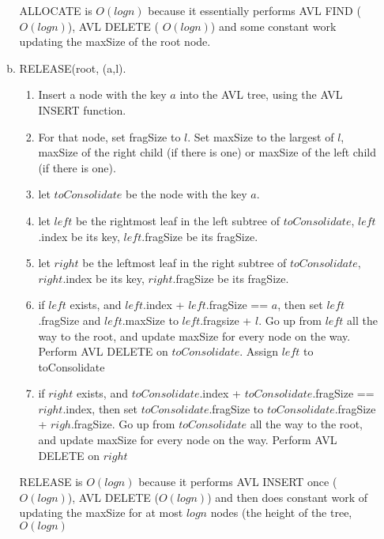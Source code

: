 \documentclass[11pt]{article}
\begin{document}
\begin{enumerate}
\begin{enumerate}[a)]
				ALLOCATE is $O(log n)$ because it essentially performs AVL FIND  ($O(log n)$), AVL DELETE ( $O(log n)$) and some constant work updating the maxSize of the root node.
				\item RELEASE(root, (a,l). 
				\begin{enumerate}
					\item Insert a node with the key $a$ into the AVL tree, using the AVL INSERT function. 
					\item For that node, set fragSize to $l$. Set maxSize to the largest of $l$, maxSize of the right child (if there is one) or maxSize of the left child (if there is one).
					\item let $toConsolidate$ be the node with the key $a$.
					\item let $left$ be the rightmost leaf in the left subtree of  $toConsolidate$, $left$.index be its key, $left$.fragSize be its fragSize.
					\item let $right$ be the leftmost leaf in the right subtree of $toConsolidate$, $right$.index be its key, $right$.fragSize be its fragSize.
					\item if $left$ exists, and $left$.index + $left$.fragSize == $a$, then set $left$.fragSize and $left$.maxSize to $left$.fragsize + $l$. Go up from $left$ all the way to the root, and update maxSize for every node on the way. Perform AVL DELETE on $toConsolidate$. Assign $left$ to toConsolidate
					\item if $right$ exists, and $toConsolidate$.index + $toConsolidate$.fragSize == $right$.index, then set $toConsolidate$.fragSize to $toConsolidate$.fragSize + $righ$.fragSize. Go up from $toConsolidate$ all the way to the root, and update maxSize for every node on the way. Perform AVL DELETE on $right$
				\end{enumerate}
				
				RELEASE is $O(logn)$ because it performs AVL INSERT once ($O(logn)$), AVL DELETE ($O(logn)$) and then does constant work of updating the maxSize for at most $logn$ nodes (the height of the tree, $O(logn)$
				
			\end{enumerate}
	\end{enumerate}
\end{document}
